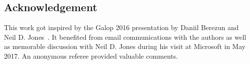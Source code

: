 \documentclass{elsarticle}
\theoremstyle{plain}
\theoremstyle{definition}
\begin{document}




\subsection*{Acknowledgement}
This work got inspired by the Galop 2016 presentation by Daniil Berezun and Neil D. Jones~\cite{berezunjones_partialevalbytraversals}. It benefited from email communications with the authors as well as memorable discussion with Neil D. Jones during his visit at Microsoft in May 2017.
An anonymous referee provided valuable comments.


\end{document}
